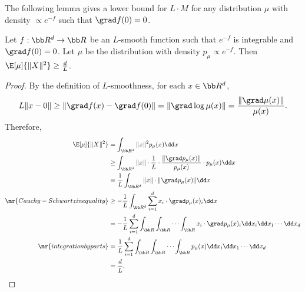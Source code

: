 The following lemma gives a lower bound for $L\cdot M$ for any distribution $\mu$ with density $\propto e^{-f}$ such that $\grad f(0)=0$.
\begin{lemma}\label{lem:lb-LM}
    Let $f:\bb R^d\to \bb R$ be an $L$-smooth function such that $e^{-f}$ is integrable and $\grad f(0)=0$. Let $\mu$ be the distribution with density $p_{\mu}\propto e^{-f}$. Then $\E[\mu]{\|X\|^2}\geq \frac{d}{L}$.
\end{lemma}
\begin{proof}
    By the definition of $L$-smoothness, for each $x\in \bb R^d$, 
    \[
        L\|x-0\| \geq \|\grad f(x) - \grad f(0)\| = \|\grad \log \mu(x)\| = \frac{\|\grad \mu(x)\|}{\mu(x)}.
    \]
    Therefore,
    \begin{align*}
        \E[\mu]{\|X\|^2} &= \int_{\bb R^d} \|x\|^2 p_\mu(x) \dd x\\
        &\geq \int_{\bb R^d} \|x\|\cdot \frac{1}{L}\cdot \frac{\|\grad p_\mu(x)\|}{p_\mu(x)}  \cdot p_\mu(x) \dd x \\
        &= \frac{1}{L} \int_{\bb R^d} \|x\|\cdot \|\grad p_\mu(x)\|\dd x  \\
        \mr{Cauchy-Schwartz inequality}&\geq -\frac{1}{L} \int_{\bb R^d} \sum_{i=1}^d x_i\cdot \grad p_\mu(x)_i\dd x \\
        &= -\frac{1}{L}\sum_{i=1}^d \int_{\bb R} \int_{\bb R}\cdots \int_{\bb R} x_i\cdot \grad p_\mu(x)_i\dd x_i \dd x_1\cdots \dd x_d \\
        \mr{integration by parts}&= \frac{1}{L}\sum_{i=1}^d \int_{\bb R} \int_{\bb R}\cdots \int_{\bb R}  p_\mu(x)\dd x_i \dd x_1\cdots \dd x_d \\
        &= \frac{d}{L}.
    \end{align*}
\end{proof}
